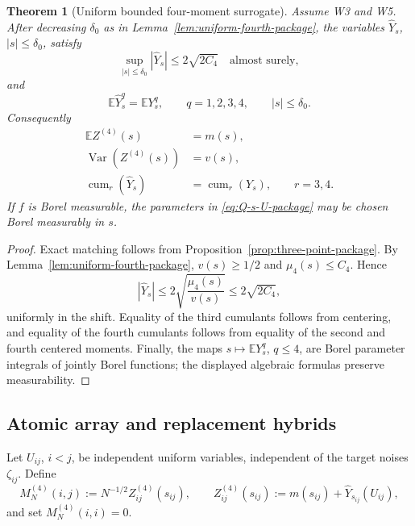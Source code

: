 \documentclass[10pt,a4paper]{amsart}
\newtheorem{theorem}{Theorem}[section]
\newcommand{\E}{\mathbb E}
\newcommand{\Var}{\operatorname{Var}}
\newcommand{\cum}{\operatorname{cum}}
\begin{document}
\begin{theorem}[Uniform bounded four-moment surrogate]
\label{thm:uniform-four-surrogate-package}
Assume W3 and W5.  After decreasing \(\delta_0\) as in
Lemma~\ref{lem:uniform-fourth-package}, the variables
\(\widehat Y_s\), \(|s|\le\delta_0\), satisfy
\begin{equation}\label{eq:uniform-support-surrogate-package}
 \sup_{|s|\le\delta_0}|\widehat Y_s|
 \le 2\sqrt{2C_4}
 \quad\text{almost surely},
\end{equation}
and
\begin{equation}\label{eq:uniform-four-match-package}
 \E\widehat Y_s^q=\E Y_s^q,
 \qquad q=1,2,3,4,
 \qquad |s|\le\delta_0.
\end{equation}
Consequently
\begin{align}
 \E Z^{(4)}(s)&=m(s),\\
 \Var(Z^{(4)}(s))&=v(s),\\
 \cum_r(\widehat Y_s)&=\cum_r(Y_s),
 \qquad r=3,4.
\end{align}
If \(f\) is Borel measurable, the parameters in
\eqref{eq:Q-s-U-package} may be chosen Borel measurably in \(s\).
\end{theorem}

\begin{proof}
Exact matching follows from Proposition~\ref{prop:three-point-package}.  By
Lemma~\ref{lem:uniform-fourth-package},
\(v(s)\ge1/2\) and \(\mu_4(s)\le C_4\).  Hence
\[
 |\widehat Y_s|
 \le2\sqrt{\frac{\mu_4(s)}{v(s)}}
 \le2\sqrt{2C_4},
\]
uniformly in the shift.  Equality of the third cumulants follows from
centering, and equality of the fourth cumulants follows from equality of the
second and fourth centered moments.  Finally, the maps
\(s\mapsto\E Y_s^q\), \(q\le4\), are Borel parameter integrals of jointly
Borel functions; the displayed algebraic formulas preserve measurability.
\end{proof}


\subsection{Atomic array and replacement hybrids}

Let \(U_{ij}\), \(i<j\), be independent uniform variables, independent of the
target noises \(\zeta_{ij}\).  Define
\begin{equation}\label{eq:atomic-array-package}
 M_N^{(4)}(i,j)
 :=N^{-1/2}Z^{(4)}_{ij}(s_{ij}),
 \qquad
 Z^{(4)}_{ij}(s_{ij})
 :=m(s_{ij})+\widehat Y_{s_{ij}}(U_{ij}),
\end{equation}
and set \(M_N^{(4)}(i,i)=0\).
\end{document}
